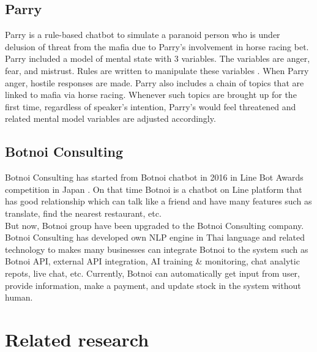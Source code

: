 \documentclass[12pt,oneside,openright,a4paper]{cpe-english-project}
\begin{document}
\subsection{Parry}
Parry is a rule-based chatbot to simulate a paranoid person who is under delusion of threat
from the mafia due to Parry’s involvement in horse racing bet. Parry included a model of mental
state with 3 variables. The variables are anger, fear, and mistrust. Rules are written to
manipulate these variables \cite{parry_met_eliza}
. When Parry anger, hostile responses are made. Parry also includes a chain of topics that are
linked to mafia via horse racing. Whenever such topics are brought up for the first time,
regardless of speaker’s intention, Parry’s would feel threatened and related mental model
variables are adjusted accordingly.

\subsection{Botnoi Consulting}
Botnoi Consulting has started from Botnoi chatbot in 2016 in Line Bot Awards competition in Japan \cite{botnoi_enterprise_chatbot}.
On that time Botnoi is a chatbot on Line platform that has good relationship which can talk like
a friend and have many features such as translate, find the nearest restaurant, etc.\\
But now, Botnoi group have been upgraded to the Botnoi Consulting company. Botnoi Consulting
has developed own NLP engine in Thai language and related technology to makes many businesses
can integrate Botnoi to the system such as Botnoi API, external API integration, AI training
\& monitoring, chat analytic repots, live chat, etc. Currently, Botnoi can automatically get
input from user, provide information, make a payment, and update stock in the system without human.

\section{Related research}
\end{document}
